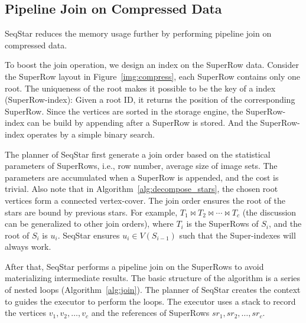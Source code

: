\subsection{Pipeline Join on Compressed Data}\label{sec:match_join}
SeqStar reduces the memory usage further by performing pipeline join on compressed data.

To boost the join operation, we design an index on the SuperRow data.
Consider the SuperRow layout in Figure~\ref{img:compress}, each SuperRow contains only one root.
The uniqueness of the root makes it possible to be the key of a index (SuperRow-index):
Given a root ID, it returns the position of the corresponding SuperRow.
Since the vertices are sorted in the storage engine,
the SuperRow-index can be build by appending after a SuperRow is stored.
And the SuperRow-index operates by a simple binary search.

The planner of SeqStar first generate a join order based on the statistical parameters of SuperRows,
i.e., row number, average size of image sets.
The parameters are accumulated when a SuperRow is appended, and the cost is trivial.
Also note that in Algorithm~\ref{alg:decompose_stars}, the chosen root vertices form a connected vertex-cover.
The join order ensures the root of the stars are bound by previous stars.
For example, $T_1 \Join T_2 \Join \cdots \Join T_c$ (the discussion can be generalized to other join orders),
where $T_i$ is the SuperRows of $S_i$, and the root of $S_i$ is $u_i$.
SeqStar ensures $u_i \in V(S_{i-1})$ such that the Super-indexes will always work.

After that, SeqStar performs a pipeline join on the SuperRows to avoid materializing intermediate results.
The basic structure of the algorithm is a series of nested loops  (Algorithm~\ref{alg:join}).
The planner of SeqStar creates the context to guides the executor to perform the loops.
The executor uses a stack to record the vertices $v_1, v_2, \dots, v_c$ and the references of SuperRows $sr_1, sr_2, \dots, sr_c$.

